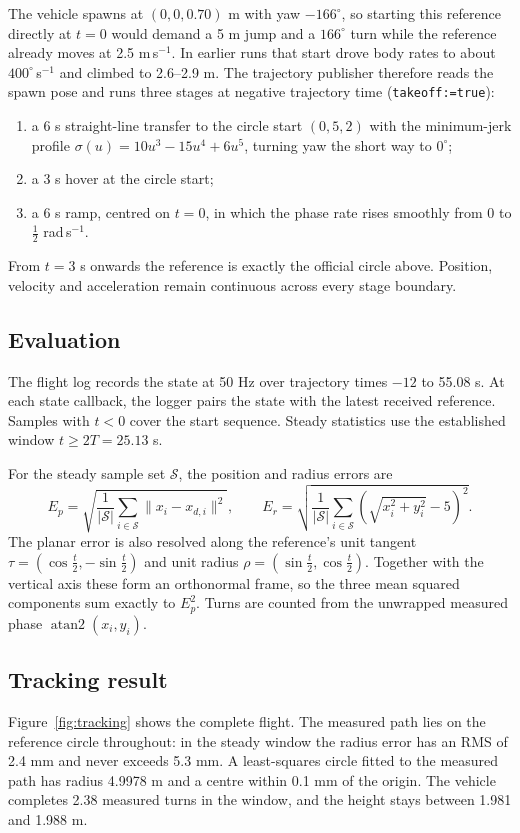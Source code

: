 \documentclass[12pt,a4paper,twoside]{article}
\begin{document}
The vehicle spawns at $(0,0,0.70)$ m with yaw $-166^\circ$, so starting this reference directly at $t=0$ would demand a 5 m jump and a $166^\circ$ turn while the reference already moves at 2.5 m\,s$^{-1}$. In earlier runs that start drove body rates to about $400^\circ$\,s$^{-1}$ and climbed to 2.6--2.9 m. The trajectory publisher therefore reads the spawn pose and runs three stages at negative trajectory time (\texttt{takeoff:=true}):
\begin{enumerate}
 \item a 6 s straight-line transfer to the circle start $(0,5,2)$ with the minimum-jerk profile $\sigma(u)=10u^3-15u^4+6u^5$, turning yaw the short way to $0^\circ$;
 \item a 3 s hover at the circle start;
 \item a 6 s ramp, centred on $t=0$, in which the phase rate rises smoothly from 0 to $\tfrac12$ rad\,s$^{-1}$.
\end{enumerate}
From $t=3$ s onwards the reference is exactly the official circle above. Position, velocity and acceleration remain continuous across every stage boundary.

\subsection{Evaluation}
The flight log records the state at 50 Hz over trajectory times $-12$ to 55.08 s. At each state callback, the logger pairs the state with the latest received reference. Samples with $t<0$ cover the start sequence. Steady statistics use the established window $t\geq2T=25.13$ s.

For the steady sample set $\mathcal{S}$, the position and radius errors are
\begin{equation}
 E_p=\sqrt{\frac{1}{|\mathcal{S}|}\sum_{i\in\mathcal{S}}\|x_i-x_{d,i}\|^2},\qquad
 E_r=\sqrt{\frac{1}{|\mathcal{S}|}\sum_{i\in\mathcal{S}}
 \left(\sqrt{x_i^2+y_i^2}-5\right)^2}.
\end{equation}
The planar error is also resolved along the reference's unit tangent $\tau=(\cos\tfrac t2,-\sin\tfrac t2)$ and unit radius $\rho=(\sin\tfrac t2,\cos\tfrac t2)$. Together with the vertical axis these form an orthonormal frame, so the three mean squared components sum exactly to $E_p^2$. Turns are counted from the unwrapped measured phase $\operatorname{atan2}(x_i,y_i)$.

\subsection{Tracking result}
Figure~\ref{fig:tracking} shows the complete flight. The measured path lies on the reference circle throughout: in the steady window the radius error has an RMS of 2.4 mm and never exceeds 5.3 mm. A least-squares circle fitted to the measured path has radius 4.9978 m and a centre within 0.1 mm of the origin. The vehicle completes 2.38 measured turns in the window, and the height stays between 1.981 and 1.988 m.
\end{document}
